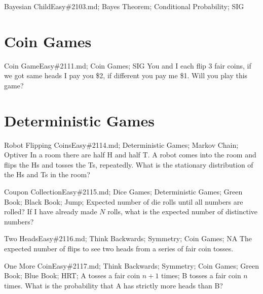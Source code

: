 \documentclass[oldfontcommands]{memoir}
\begin{document}
{\begin{question}{Bayesian Child}{Easy}{\#2103.md; Bayes Theorem; Conditional Probability; SIG}
\end{question}

\section{Coin Games}
\begin{question}{Coin Game}{Easy}{\#2111.md; Coin Games; SIG}
You and I each flip 3 fair coins, if we got same heads I pay you \$2, if different you pay me \$1. Will you play this game?

\end{question}

\section{Deterministic Games}
\begin{question}{Robot Flipping Coins}{Easy}{\#2114.md; Deterministic Games; Markov Chain; Optiver}
In a room there are half H and half T. A robot comes into the room and flips the Hs and tosses the Ts, repeatedly. What is the stationary distribution of the Hs and Ts in the room?

\end{question}

\begin{question}{Coupon Collection}{Easy}{\#2115.md; Dice Games; Deterministic Games; Green Book; Black Book; Jump;}
Expected number of die rolls until all numbers are rolled? If I have already made $N$ rolls, what is the expected number of distinctive numbers?

\end{question}

\begin{question}{Two Heads}{Easy}{\#2116.md; Think Backwards; Symmetry; Coin Games; NA}
The expected number of flips to see two heads from a series of fair coin tosses.

\end{question}

\begin{question}{One More Coin}{Easy}{\#2117.md; Think Backwards; Symmetry; Coin Games; Green Book; Blue Book; HRT;}
A tosses a fair coin $n+1$ times; B tosses a fair coin $n$ times. What is the probability that A has strictly more heads than B?

\end{question}

}
\end{document}
